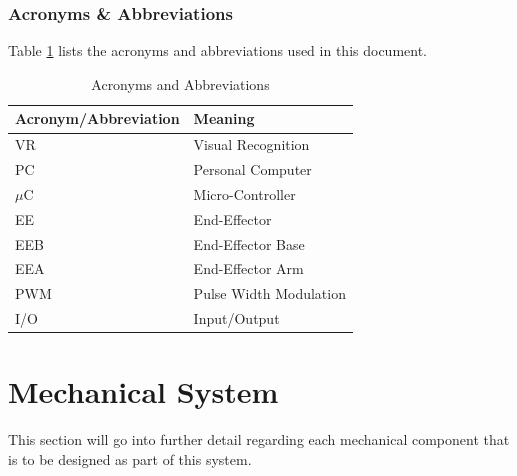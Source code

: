 \documentclass[titlepage]{article}
\begin{document}
\subsubsection{Acronyms \& Abbreviations}
Table \ref{tab:Acronyms} lists the acronyms and abbreviations used in this document.
\begin{table}[h!]
\centering
\caption{Acronyms and Abbreviations}
\begin{tabular}{| p{6cm} | p{6cm} |}\hline
	\textbf{Acronym/Abbreviation}	&\textbf{Meaning}\\\hline
	VR								&Visual Recognition\\\hline
	PC								&Personal Computer\\\hline
	$\mu$C							&Micro-Controller\\\hline
	EE								&End-Effector\\\hline
	EEB								&End-Effector Base\\\hline
	EEA								&End-Effector Arm\\\hline
	PWM								&Pulse Width Modulation\\\hline
	I/O								&Input/Output\\\hline
\end{tabular}
\label{tab:Acronyms}
\end{table}



\newpage
\section{Mechanical System}
This section will go into further detail regarding each mechanical component that is to be designed as part of this system.
\end{document}
